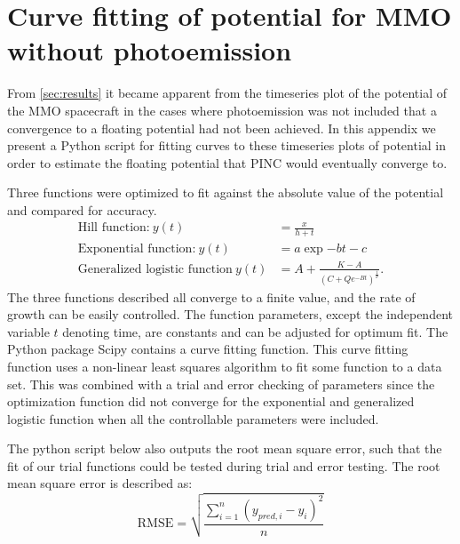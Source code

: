 \chapter{Curve fitting of potential for MMO without photoemission}
\label{sec:second-app}
\newenvironment{longlisting}{\captionsetup{type=listing}}{}

From \cref{sec:results} it became apparent from the timeseries plot of the potential of the MMO spacecraft in the cases where photoemission was not included that a convergence to a floating potential had not been achieved. In this appendix we present a Python script for fitting curves to these timeseries plots of potential in order to estimate the floating potential that PINC would eventually converge to.

Three functions were optimized to fit against the absolute value of the potential and compared for accuracy.
\begin{subequations}
    \begin{align}
        \text{Hill function:} \: y(t) &= \frac{x}{h + t}\label{eq:Hill} \\
        \text{Exponential function:} \: y(t) &= a \exp{-b t} - c \label{eq:expFit} \\
        \text{Generalized logistic function} \: y(t) &=  A + \frac{K - A}{\left(C + Q e^{-B t}\right)^{\frac{1}{\nu}}}.\label{eq:genLog}
    \end{align}
\end{subequations}
The three functions described all converge to a finite value, and the rate of growth can be easily controlled. The function parameters, except the independent variable $t$ denoting time, are constants and can be adjusted for optimum fit. The Python package Scipy contains a curve fitting function. This curve fitting function uses a non-linear least squares algorithm to fit some function to a data set. This was combined with a trial and error checking of parameters since the optimization function did not converge for the exponential and generalized logistic function when all the controllable parameters were included. 

The python script below also outputs the root mean square error, such that the fit of our trial functions could be tested during trial and error testing. The root mean square error is described as:
\begin{equation}\label{eq:RMSE}
    \text{RMSE} = \sqrt{\frac{\sum^n_{i=1} \left(y_{pred,i} - y_i \right)^2}{n}}
\end{equation}

